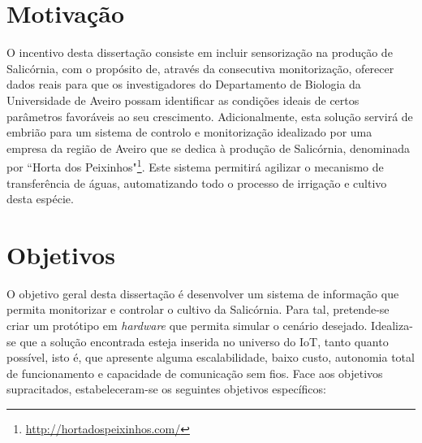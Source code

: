 \section{Motivação}

O incentivo desta dissertação consiste em incluir sensorização na produção de Salicórnia, com o propósito de, através da consecutiva monitorização, oferecer dados reais para que os investigadores do Departamento de Biologia da Universidade de Aveiro possam identificar as condições ideais de certos parâmetros favoráveis ao seu crescimento. Adicionalmente, esta solução servirá de embrião para um sistema de controlo e monitorização idealizado por uma empresa da região de Aveiro que se dedica à produção de Salicórnia, denominada por ``Horta dos Peixinhos"\footnote{\url{http://hortadospeixinhos.com/}}. Este sistema permitirá agilizar o mecanismo de transferência de águas, automatizando todo o processo de irrigação e cultivo desta espécie. 






\section{Objetivos}
\label{objectivos}

O objetivo geral desta dissertação é desenvolver um sistema de informação que permita monitorizar e controlar o cultivo da Salicórnia. Para tal, pretende-se criar um protótipo em \textit{hardware} que permita  simular o cenário desejado. Idealiza-se que a solução encontrada esteja inserida no universo do \ac{IoT}\cite{Farooq2015}, tanto quanto possível, isto é, que apresente alguma escalabilidade, baixo custo, autonomia total de funcionamento e capacidade de comunicação sem fios. Face aos objetivos supracitados, estabeleceram-se os seguintes objetivos específicos:

